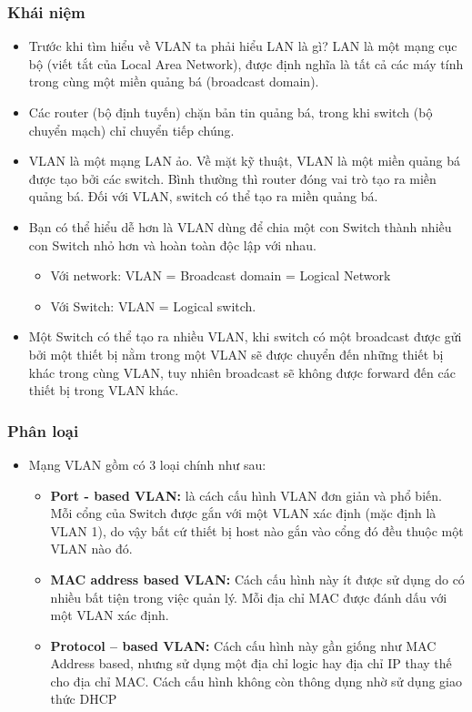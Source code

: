 \documentclass[13pt]{article}
\begin{document}
\subsubsection{Khái niệm}
\begin{itemize}
    \item Trước khi tìm hiểu về VLAN ta phải hiểu LAN là gì? LAN là một mạng cục bộ (viết tắt của Local Area Network), được định nghĩa là tất cả các máy tính trong cùng một miền quảng bá (broadcast domain).
    \item Các router (bộ định tuyến) chặn bản tin quảng bá, trong khi switch (bộ chuyển mạch) chỉ chuyển tiếp chúng.
    \item VLAN là một mạng LAN ảo. Về mặt kỹ thuật, VLAN là một miền quảng bá được tạo bởi các switch. Bình thường thì router đóng vai trò tạo ra miền quảng bá. Đối với VLAN, switch có thể tạo ra miền quảng bá.
    \item Bạn có thể hiểu dễ hơn là VLAN dùng để chia một con Switch thành nhiều con Switch nhỏ hơn và hoàn toàn độc lập với nhau.
    \begin{itemize}
        \item Với network: VLAN = Broadcast domain = Logical Network 
        \item Với Switch: VLAN = Logical switch.
    \end{itemize}
    \item Một Switch có thể tạo ra nhiều VLAN, khi switch có một broadcast được gửi bởi một thiết bị nằm trong một VLAN sẽ được chuyển đến những thiết bị khác trong cùng VLAN, tuy nhiên broadcast sẽ không được forward đến các thiết bị trong VLAN khác.
\end{itemize}

\subsubsection{Phân loại}
\begin{itemize}
    \item Mạng VLAN gồm có 3 loại chính như sau:
    \begin{itemize}
        \item \textbf{Port - based VLAN:} là cách cấu hình VLAN đơn giản và phổ biến. Mỗi cổng của Switch được gắn với một VLAN xác định (mặc định là VLAN 1), do vậy bất cứ thiết bị host nào gắn vào cổng đó đều thuộc một VLAN nào đó.
        \item \textbf{MAC address based VLAN:} Cách cấu hình này ít được sử dụng do có nhiều bất tiện trong việc quản lý. Mỗi địa chỉ MAC được đánh dấu với một VLAN xác định.
        \item \textbf{Protocol – based VLAN:} Cách cấu hình này gần giống như MAC Address based, nhưng sử dụng một địa chỉ logic hay địa chỉ IP thay thế cho địa chỉ MAC. Cách cấu hình không còn thông dụng nhờ sử dụng giao thức DHCP
    \end{itemize}
\end{itemize}
\end{document}
